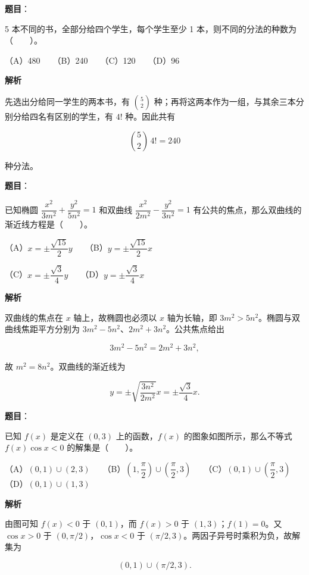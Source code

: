 \begin{answer}

\textbf{题目}：

5 本不同的书，全部分给四个学生，每个学生至少 1 本，则不同的分法的种数为\mbox{（　　）}。

（A）480　　（B）240　　（C）120　　（D）96

\textbf{解析}

先选出分给同一学生的两本书，有 $\binom52$ 种；再将这两本作为一组，与其余三本分别分给四名有区别的学生，有 $4!$ 种。因此共有

\nopagebreak[4]
\[\binom52\,4!=240\]

种分法。


\end{answer}
\begin{answer}

\textbf{题目}：

已知椭圆 \(\dfrac{x^2}{3m^2}+\dfrac{y^2}{5n^2}=1\) 和双曲线 \(\dfrac{x^2}{2m^2}-\dfrac{y^2}{3n^2}=1\) 有公共的焦点，那么双曲线的渐近线方程是\mbox{（　　）}。

（A）\(x=\pm\dfrac{\sqrt{15}}2y\)　　（B）\(y=\pm\dfrac{\sqrt{15}}2x\)

（C）\(x=\pm\dfrac{\sqrt3}{4}y\)　　（D）\(y=\pm\dfrac{\sqrt3}{4}x\)

\textbf{解析}

双曲线的焦点在 $x$ 轴上，故椭圆也必须以 $x$ 轴为长轴，即 $3m^2>5n^2$。椭圆与双曲线焦距平方分别为 $3m^2-5n^2$、$2m^2+3n^2$。公共焦点给出

\nopagebreak[4]
\[3m^2-5n^2=2m^2+3n^2,\]

故 $m^2=8n^2$。双曲线的渐近线为

\nopagebreak[4]
\[y=\pm\sqrt{\frac{3n^2}{2m^2}}x=\pm\frac{\sqrt3}{4}x.\]


\end{answer}
\begin{answer}

\textbf{题目}：

已知 \(f(x)\) 是定义在 \((0,3)\) 上的函数，\(f(x)\) 的图象如图所示，那么不等式 \(f(x)\cos x<0\) 的解集是\mbox{（　　）}。
\nopagebreak[4]
\begin{center}\end{center}
\nopagebreak[4]
（A）\((0,1)\cup(2,3)\)　　（B）\((1,\dfrac\pi2)\cup(\dfrac\pi2,3)\)　　（C）\((0,1)\cup(\dfrac\pi2,3)\)　　（D）\((0,1)\cup(1,3)\)

\textbf{解析}

由图可知 $f(x)<0$ 于 $(0,1)$，而 $f(x)>0$ 于 $(1,3)$；$f(1)=0$。又 $\cos x>0$ 于 $(0,\pi/2)$，$\cos x<0$ 于 $(\pi/2,3)$。两因子异号时乘积为负，故解集为

\nopagebreak[4]
\[ (0,1)\cup(\pi/2,3).\]


\end{answer}
